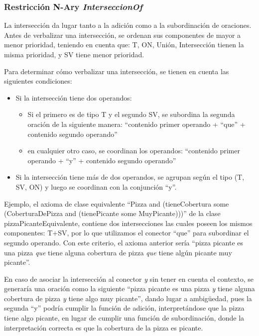 \subsubsection{Restricción N-Ary \emph{InterseccionOf}}
La intersección da lugar tanto a la adición como a la subordinación de oraciones. Antes de verbalizar una intersección, se ordenan sus componentes de mayor a menor prioridad, teniendo en cuenta que: T, ON, Unión, Intersección tienen la misma prioridad, y SV tiene menor prioridad. 

Para determinar cómo verbalizar una intersección, se tienen en cuenta las siguientes condiciones:
\begin{itemize}
    \item Si la intersección tiene dos operandos:
        \begin{itemize}
            \item Si el primero es de tipo T  y el segundo SV, se subordina la segunda oración de la siguiente manera:
            ``contenido primer operando + ``que'' + contenido segundo operando''
            \item en cualquier otro caso, se coordinan los operandos:
            ``contenido primer operando + ``y'' + contenido segundo operando''
        \end{itemize}
        \item Si la intersección tiene más de dos operandos, se agrupan según el tipo  (T, SV, ON) y luego se coordinan con la conjunción ``y''.
\end{itemize}

Ejemplo, el axioma de clase equivalente ``Pizza and (tieneCobertura some (CoberturaDePizza and (tienePicante some MuyPicante)))'' de la clase pizzaPicanteEquivalente, contiene dos intersecciones las cuales poseen los mismos componentes: T$+$SV, por lo que utilizamos el conector ``que'' para subordinar el segundo operando. Con este criterio, el axioma anterior sería ``pizza picante es una pizza \emph{que} tiene alguna cobertura de pizza \emph{que} tiene algún picante muy picante''.

En caso de asociar la intersección al conector \emph{y} sin tener en cuenta el contexto, se generaría una oración como la siguiente ``pizza picante es una pizza \emph{y} tiene alguna cobertura de pizza \emph{y} tiene algo muy picante'', dando lugar a ambigüedad, pues la segunda ``y'' podría cumplir la función de adición, interpretándose que la pizza tiene algo picante, en lugar de cumplir una función de subordinación, donde la interpretación correcta es que la cobertura de la pizza es picante. 


